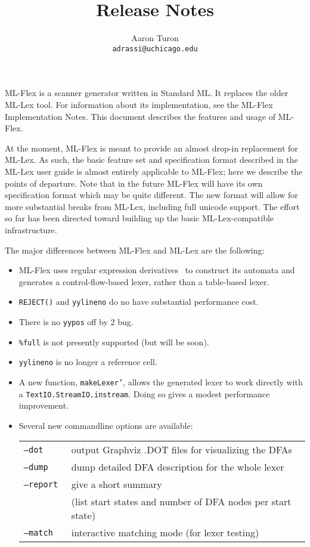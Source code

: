 \documentclass[11pt]{article}
\title{\flex{} Release Notes}
\author{Aaron Turon\\
\texttt{adrassi@uchicago.edu}}
\newcommand{\flex}{ML-Flex}
\begin{document}
\maketitle

\flex{} is a scanner generator written in Standard ML.  It replaces the older
ML-Lex tool.  For information about its implementation, see the
\flex{} Implementation Notes. This document describes the features and usage of
\flex{}.

At the moment, \flex{} is meant to provide an almost drop-in replacement for
ML-Lex.  As such, the basic feature set and specification format described in
the ML-Lex user guide is almost entirely applicable to \flex{}; here we describe
the points of departure.  Note that in the future \flex{} will have its own
specification format which may be quite different.  The new format will allow
for more substantial breaks from ML-Lex, including full unicode support.  The
effort so far has been directed toward building up the basic ML-Lex-compatible
infrastructure.

The major differences between \flex{} and ML-Lex are the following:
\begin{itemize}

\item \flex{} uses regular expression derivatives~\cite{derivatives} to
construct
its automata and generates a control-flow-based lexer, rather than a
table-based lexer.

\item \texttt{REJECT()} and \texttt{yylineno} do no have substantial
performance cost.

\item There is no \texttt{yypos} off by 2 bug.

\item \texttt{\%full} is not presently supported (but will be soon).

\item \texttt{yylineno} is no longer a reference cell.

\item A new function, \texttt{makeLexer'}, allows the generated lexer to work
directly with a \texttt{TextIO.StreamIO.instream}.  Doing so gives a modest
performance improvement.

\item Several new commandline options are available:

\begin{center}
\begin{tabular}{ll}
\tt --dot & output Graphviz .DOT files for visualizing the DFAs \\
\tt --dump & dump detailed DFA description for the whole lexer \\
\tt --report & give a short summary \\
    & (list start states and number of DFA nodes
per start state) \\
\tt --match & interactive matching mode (for lexer testing)
\end{tabular}
\end{center}


\end{itemize}



\end{document}
